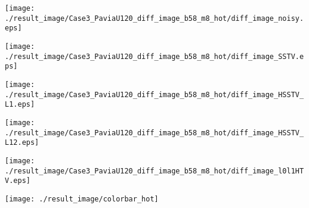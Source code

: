 \begin{figure*}[t]
\begin{center}
        \begin{minipage}{0.150\hsize}
            \centerline{\hspace{\hsize}} %
		\end{minipage}
        \begin{minipage}{0.150\hsize}
            \centerline{\texttt{[image: ./result\_image/Case3\_PaviaU120\_diff\_image\_b58\_m8\_hot/diff\_image\_noisy.eps]}} %
        \end{minipage}
        \begin{minipage}{0.150\hsize}
            \centerline{\texttt{[image: ./result\_image/Case3\_PaviaU120\_diff\_image\_b58\_m8\_hot/diff\_image\_SSTV.eps]}} %
        \end{minipage}
        \begin{minipage}{0.150\hsize}
            \centerline{\texttt{[image: ./result\_image/Case3\_PaviaU120\_diff\_image\_b58\_m8\_hot/diff\_image\_HSSTV\_L1.eps]}} %
        \end{minipage}
        \begin{minipage}{0.150\hsize}
            \centerline{\texttt{[image: ./result\_image/Case3\_PaviaU120\_diff\_image\_b58\_m8\_hot/diff\_image\_HSSTV\_L12.eps]}} %
        \end{minipage}
        \begin{minipage}{0.150\hsize}
            \centerline{\texttt{[image: ./result\_image/Case3\_PaviaU120\_diff\_image\_b58\_m8\_hot/diff\_image\_l0l1HTV.eps]}} %
        \end{minipage}
        \begin{minipage}{0.055\hsize}
            \centerline{\texttt{[image: ./result\_image/colorbar\_hot]}} %
        \end{minipage}

        \vspace{1mm}


\end{center}
\end{figure*}

